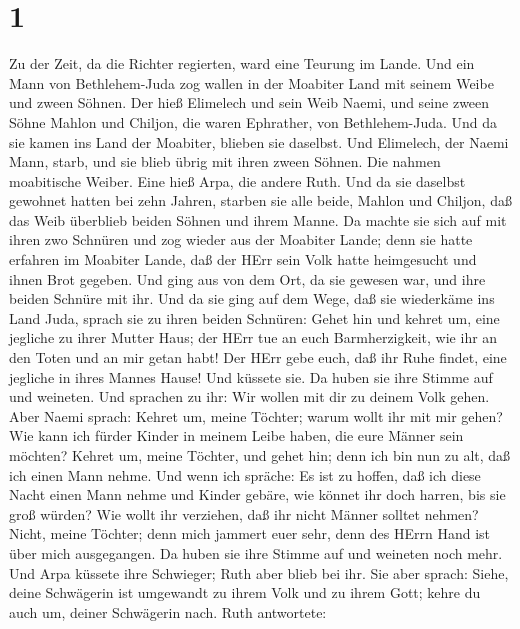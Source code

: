 \hypertarget{section}{%
\section{1}\label{section}}

 Zu der Zeit, da die Richter regierten, ward eine Teurung im
Lande. Und ein Mann von Bethlehem-Juda zog wallen in der Moabiter Land
mit seinem Weibe und zween Söhnen.  Der hieß Elimelech und
sein Weib Naemi, und seine zween Söhne Mahlon und Chiljon, die waren
Ephrather, von Bethlehem-Juda. Und da sie kamen ins Land der Moabiter,
blieben sie daselbst.  Und Elimelech, der Naemi Mann, starb,
und sie blieb übrig mit ihren zween Söhnen.  Die nahmen
moabitische Weiber. Eine hieß Arpa, die andere Ruth. Und da sie daselbst
gewohnet hatten bei zehn Jahren,  starben sie alle beide,
Mahlon und Chiljon, daß das Weib überblieb beiden Söhnen und ihrem
Manne.  Da machte sie sich auf mit ihren zwo Schnüren und
zog wieder aus der Moabiter Lande; denn sie hatte erfahren im Moabiter
Lande, daß der HErr sein Volk hatte heimgesucht und ihnen Brot gegeben.
 Und ging aus von dem Ort, da sie gewesen war, und ihre
beiden Schnüre mit ihr. Und da sie ging auf dem Wege, daß sie wiederkäme
ins Land Juda,  sprach sie zu ihren beiden Schnüren: Gehet
hin und kehret um, eine jegliche zu ihrer Mutter Haus; der HErr tue an
euch Barmherzigkeit, wie ihr an den Toten und an mir getan habt!
 Der HErr gebe euch, daß ihr Ruhe findet, eine jegliche in
ihres Mannes Hause! Und küssete sie. Da huben sie ihre Stimme auf und
weineten.  Und sprachen zu ihr: Wir wollen mit dir zu
deinem Volk gehen.  Aber Naemi sprach: Kehret um, meine
Töchter; warum wollt ihr mit mir gehen? Wie kann ich fürder Kinder in
meinem Leibe haben, die eure Männer sein möchten?  Kehret
um, meine Töchter, und gehet hin; denn ich bin nun zu alt, daß ich einen
Mann nehme. Und wenn ich spräche: Es ist zu hoffen, daß ich diese Nacht
einen Mann nehme und Kinder gebäre,  wie könnet ihr doch
harren, bis sie groß würden? Wie wollt ihr verziehen, daß ihr nicht
Männer solltet nehmen? Nicht, meine Töchter; denn mich jammert euer
sehr, denn des HErrn Hand ist über mich ausgegangen.  Da
huben sie ihre Stimme auf und weineten noch mehr. Und Arpa küssete ihre
Schwieger; Ruth aber blieb bei ihr.  Sie aber sprach:
Siehe, deine Schwägerin ist umgewandt zu ihrem Volk und zu ihrem Gott;
kehre du auch um, deiner Schwägerin nach.  Ruth antwortete:
